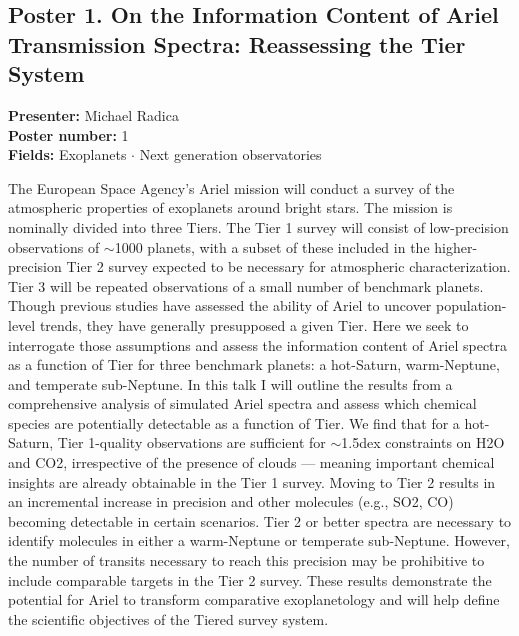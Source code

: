 
\hypertarget{poster-abstract-talk-1}{}\label{poster-abstract-page-talk-1}
\subsection*{Poster 1. On the Information Content of Ariel Transmission Spectra: Reassessing the Tier System}
\textbf{Presenter:} Michael Radica\\
\textbf{Poster number:} 1\\
\textbf{Fields:} Exoplanets $\cdot$ Next generation observatories

The European Space Agency's Ariel mission will conduct a survey of the atmospheric properties of exoplanets around bright stars. The mission is nominally divided into three Tiers. The Tier 1 survey will consist of low-precision observations of $\sim$1000 planets, with a subset of these included in the higher-precision Tier 2 survey expected to be necessary for atmospheric characterization. Tier 3 will be repeated observations of a small number of benchmark planets. Though previous studies have assessed the ability of Ariel to uncover population-level trends, they have generally presupposed a given Tier. Here we seek to interrogate those assumptions and assess the information content of Ariel spectra as a function of Tier for three benchmark planets: a hot-Saturn, warm-Neptune, and temperate sub-Neptune. In this talk I will outline the results from a comprehensive analysis of simulated Ariel spectra and assess which chemical species are potentially detectable as a function of Tier. We find that for a hot-Saturn, Tier 1-quality observations are sufficient for $\sim$1.5dex constraints on H2O and CO2, irrespective of the presence of clouds --- meaning important chemical insights are already obtainable in the Tier 1 survey. Moving to Tier 2 results in an incremental increase in precision and other molecules (e.g., SO2, CO) becoming detectable in certain scenarios. Tier 2 or better spectra are necessary to identify molecules in either a warm-Neptune or temperate sub-Neptune. However, the number of transits necessary to reach this precision may be prohibitive to include comparable targets in the Tier 2 survey. These results demonstrate the potential for Ariel to transform comparative exoplanetology and will help define the scientific objectives of the Tiered survey system.

\hypertarget{poster-abstract-talk-303}{}\label{poster-abstract-page-talk-303}
